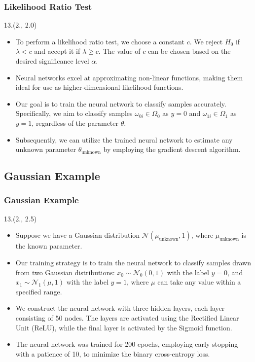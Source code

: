 \documentclass[12pt, xcolor={dvipsnames}, aspectratio = 169, sans,mathserif]{beamer}
\newenvironment{List}[2]
{\begin{textblock}{#1}#2
\begin{itemize}}
{\end{itemize}
\end{textblock}}
\newcommand{\NPcite}[1]{{\tiny \footfullcite{#1}}}
\begin{document}
\begin{frame}
\frametitle{Likelihood Ratio Test}

\begin{List}{13.}{(2., 2.0)}

  \item To perform a likelihood ratio test, we choose a constant $c$. We reject $H_0$ if $\lambda < c$ and accept it if
  $\lambda \geq c$. The value of $c$ can be chosen based on the desired significance level $\alpha$.

  \item Neural networks excel at approximating non-linear functions, making them ideal for use as higher-dimensional
  likelihood functions.

  \item Our goal is to train the neural network to classify samples accurately. Specifically, we aim to classify samples
  $\omega_{0i} \in \Omega_0$ as $y = 0$ and $\omega_{1i} \in \Omega_1$ as $y = 1$, regardless of the parameter $\theta$.

  \item Subsequently, we can utilize the trained neural network to estimate any unknown parameter $\theta_{\text{unknown}}$ by employing
  the gradient descent algorithm.\NPcite{Andreassen:2019nnm}

\end{List}

\end{frame}

\subsection{Gaussian Example}

\begin{frame}
\frametitle{Gaussian Example}

\begin{List}{13.}{(2., 2.5)}

  \item Suppose we have a Gaussian distribution $\mathcal{N}(\mu_{\text{unknown}}, 1)$, where $\mu_{\text{unknown}}$ is
  the known parameter.

  \item Our training strategy is to train the neural network to classify samples drawn from two Gaussian distributions:
  $x_{0} \sim \mathcal{N}_{0}(0, 1)$ with the label $y = 0$, and $x_{1} \sim \mathcal{N}_{1}(\mu, 1)$ with the label $y = 1$,
  where $\mu$ can take any value within a specified range.

  \item We construct the neural network with three hidden layers, each layer consisting of 50 nodes.
  The layers are activated using the Rectified Linear Unit (ReLU), while the final layer is activated by the Sigmoid function.

  \item The neural network was trained for 200 epochs, employing early stopping with a patience of 10, to minimize the
  binary cross-entropy loss.

\end{List}

\end{frame}
\end{document}
